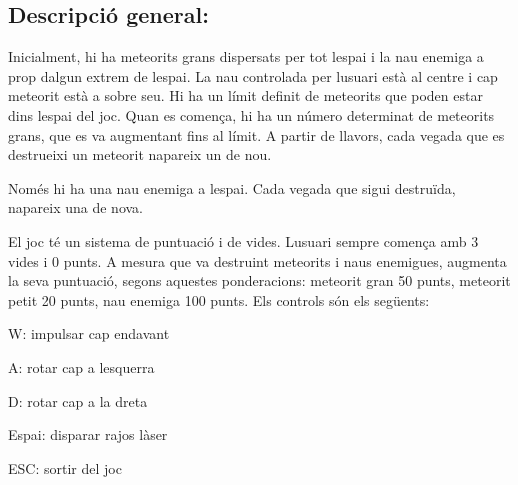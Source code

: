 \subsection*{Descripció general\+: }

Inicialment, hi ha meteorits grans dispersats per tot l\textquotesingle{}espai i la nau enemiga a prop d\textquotesingle{}algun extrem de l\textquotesingle{}espai. La nau controlada per l\textquotesingle{}usuari està al centre i cap meteorit està a sobre seu. Hi ha un límit definit de meteorits que poden estar dins l\textquotesingle{}espai del joc. Quan es comença, hi ha un número determinat de meteorits grans, que es va augmentant fins al límit. A partir de llavors, cada vegada que es destrueixi un meteorit n\textquotesingle{}apareix un de nou.

Només hi ha una nau enemiga a l\textquotesingle{}espai. Cada vegada que sigui destruïda, n\textquotesingle{}apareix una de nova.

El joc té un sistema de puntuació i de vides. L\textquotesingle{}usuari sempre comença amb 3 vides i 0 punts. A mesura que va destruint meteorits i naus enemigues, augmenta la seva puntuació, segons aquestes ponderacions\+: meteorit gran 50 punts, meteorit petit 20 punts, nau enemiga 100 punts. Els controls són els següents\+:
\begin{DoxyItemize}
\item W\+: impulsar cap endavant
\item A\+: rotar cap a l\textquotesingle{}esquerra
\item D\+: rotar cap a la dreta
\item Espai\+: disparar rajos làser
\item E\+S\+C\+: sortir del joc 
\end{DoxyItemize}